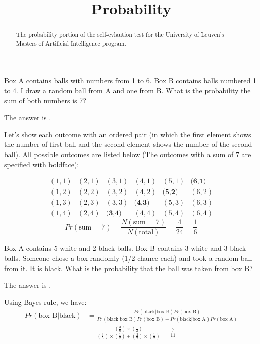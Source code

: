 \documentclass{ximera}
\title{Probability}
\begin{document}
\begin{abstract}
The probability portion of the self-evlaution test for the University
of Leuven's Masters of Artificial Intelligence program.
\end{abstract}
\maketitle


\begin{question}
Box A contains balls with numbers from 1 to 6.  Box B contains balls
numbered 1 to 4.  I draw a random ball from A and one from B.  What is
the probability the sum of both numbers is 7?
\begin{solution}
The answer is .
\end{solution}
Let's show each outcome with an ordered pair (in which the first
element shows the number of first ball and the second element shows
the number of the second ball). All possible outcomes are listed below
(The outcomes with a sum of 7 are specified with boldface):


\[
\begin{matrix}
(1,1) & (2,1) & (3,1) & (4,1) & (5,1) & \textbf{(6,1)} \\
(1,2) & (2,2) & (3,2) & (4,2) & \textbf{(5,2)} & (6,2) \\
(1,3) & (2,3) & (3,3) & \textbf{(4,3)} & (5,3) & (6,3) \\
(1,4) & (2,4) & \textbf{(3,4)} & (4,4) & (5,4) & (6,4)
\end{matrix}
\]
\[
Pr (\text{sum = 7}) = \frac{N(\text{sum = 7})}{N(\text{total})} =
\frac{4}{24} = \frac{1}{6}
\]
\end{question}

\begin{question}
Box A contains 5 white and 2 black balls.  Box B contains 3 white and
3 black balls.  Someone chose a box randomly (1/2 chance each) and
took a random ball from it.  It is black.  What is the probability
that the ball was taken from box B?
\begin{solution}
The answer is .
\end{solution}
Using Bayes rule, we have:
\begin{align*}
Pr (\text{box B} | \text{black}) &= \frac{Pr(\text{black} | \text{box B}) Pr(\text{box B})}{Pr(\text{black} | \text{box B}) Pr(\text{box B}) + Pr(\text{black} | \text{box A}) Pr(\text{box A})} \\
&=\frac{(\frac{3}{6}) \times (\frac{1}{2})}{(\frac{3}{6}) \times (\frac{1}{2}) + (\frac{2}{7}) \times (\frac{1}{2})} = \frac{7}{11}
\end{align*}
\end{question}
\end{document}
